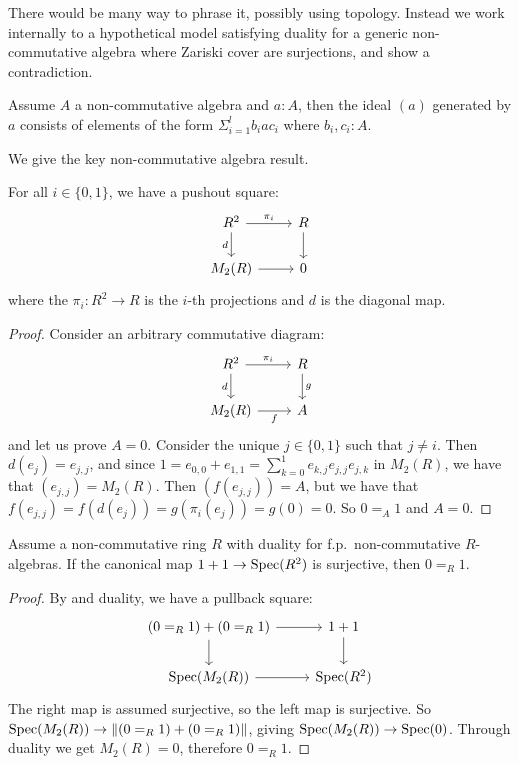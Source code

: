 There would be many way to phrase it, possibly using topology. Instead we work internally to a hypothetical model satisfying duality for a generic non-commutative algebra where Zariski cover are surjections, and show a contradiction.

\begin{remark}
Assume $A$ a non-commutative algebra and $a:A$, then the ideal $(a)$ generated by $a$ consists of elements of the form $\Sigma_{i=1}^l b_iac_i$ where $b_i,c_i:A$.
\end{remark}

We give the key non-commutative algebra result.

\begin{lemma}\label{pushout-diagonal-matrices}
For all $i\in\{0,1\}$, we have a pushout square:
\[\begin{tikzcd}
R^2\ar[d,swap,"d"]\ar[r,"\pi_i"] & R\ar[d]\\
M_2(R)\ar[r] & 0
\end{tikzcd}\]
where the $\pi_i:R^2\to R$ is the $i$-th projections and $d$ is the diagonal map.
\end{lemma}

\begin{proof}
Consider an arbitrary commutative diagram:
\[\begin{tikzcd}
R^2\ar[d,swap,"d"]\ar[r,"\pi_i"] & R\ar[d,"g"]\\
M_2(R)\ar[r,swap,"f"] & A
\end{tikzcd}\]
and let us prove $A=0$. Consider the unique $j\in\{0,1\}$ such that $j\not=i$. Then $d(e_j) = e_{j,j}$, and since $1 = e_{0,0}+e_{1,1} = \sum_{k=0}^1 e_{k,j}e_{j,j}e_{j,k}$ in $M_2(R)$, we have that $(e_{j,j}) = M_2(R)$. Then $(f(e_{j,j})) = A$, but we have that $f(e_{j,j}) =f(d(e_j)) = g(\pi_i(e_j)) = g(0) = 0$. So $0=_A1$ and $A=0$.
\end{proof}

\begin{proposition}
Assume a non-commutative ring $R$ with duality for f.p.\ non-commutative $R$-algebras. If the canonical map $1+1\to \operatorname{Spec}(R^2)$ is surjective, then $0=_R1$.
\end{proposition}

\begin{proof}
By  and duality, we have a pullback square:
\[\begin{tikzcd}
(0=_R1) + (0=_R1)\ar[d]\ar[r] & 1+1\ar[d]\\
\Spec(M_2(R))\ar[r] & \Spec(R^2)
\end{tikzcd}\]
The right map is assumed surjective, so the left map is surjective. So $\operatorname{Spec}(M_2(R))\to\lVert (0=_R1) + (0=_R1) \rVert$, giving $\operatorname{Spec}(M_2(R))\to \operatorname{Spec}(0)$. Through duality we get $M_2(R) = 0$, therefore $0=_R1$.
\end{proof}